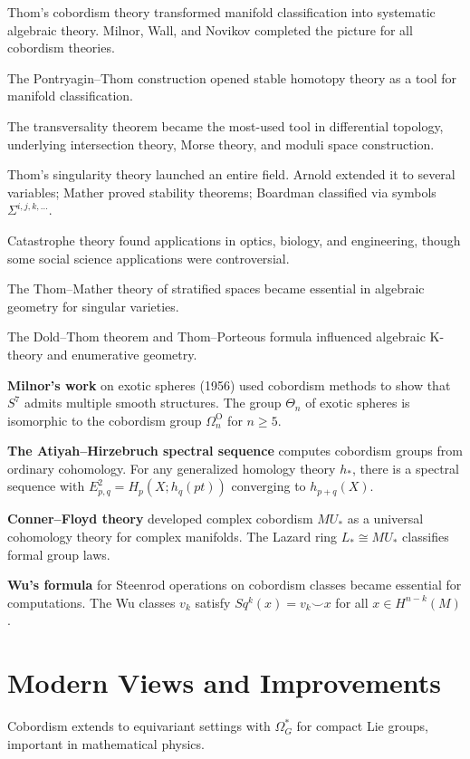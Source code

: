 Thom's cobordism theory transformed manifold classification into systematic
algebraic theory. Milnor, Wall, and Novikov completed the picture for all
cobordism theories.

The Pontryagin--Thom construction opened stable homotopy theory as a tool for
manifold classification.

The transversality theorem became the most-used tool in differential topology,
underlying intersection theory, Morse theory, and moduli space construction.

Thom's singularity theory launched an entire field. Arnold extended it to several
variables; Mather proved stability theorems; Boardman classified via symbols
$\Sigma^{i,j,k,\ldots}$.

Catastrophe theory found applications in optics, biology, and engineering, though
some social science applications were controversial.

The Thom--Mather theory of stratified spaces became essential in algebraic
geometry for singular varieties.

The Dold--Thom theorem and Thom--Porteous formula influenced algebraic K-theory
and enumerative geometry.

\textbf{Milnor's work} on exotic spheres (1956) used cobordism methods to show
that $S^7$ admits multiple smooth structures. The group $\Theta_n$ of exotic
spheres is isomorphic to the cobordism group $\Omega_n^{\text{O}}$ for $n \geq 5$.

\textbf{The Atiyah--Hirzebruch spectral sequence} computes cobordism groups from
ordinary cohomology. For any generalized homology theory $h_*$, there is a
spectral sequence with $E^2_{p,q} = H_p(X; h_q(pt))$ converging to
$h_{p+q}(X)$.

\textbf{Conner--Floyd theory} developed complex cobordism $MU_*$ as a universal
cohomology theory for complex manifolds. The Lazard ring $L_* \cong MU_*$
classifies formal group laws.

\textbf{Wu's formula} for Steenrod operations on cobordism classes became
essential for computations. The Wu classes $v_k$ satisfy $Sq^k(x) = v_k \smile
x$ for all $x \in H^{n-k}(M)$.

\section{Modern Views and Improvements}

Cobordism extends to equivariant settings with $\Omega_G^*$ for compact Lie groups,
important in mathematical physics.

